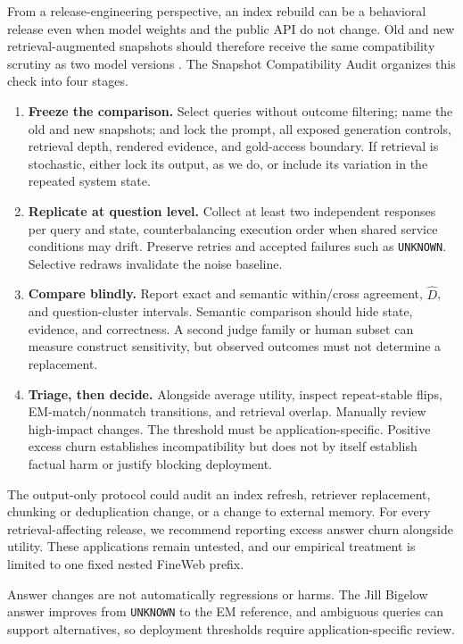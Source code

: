 \documentclass[sigconf,nonacm]{acmart}
\newcommand{\Dhat}{\widehat{D}}
\begin{document}
From a release-engineering perspective, an index rebuild can be a behavioral release even when model weights and the public API do not change. Old and new retrieval-augmented snapshots should therefore receive the same compatibility scrutiny as two model versions \cite{fard2016churn,traeuble2021backward,caciolai2023regression}. The Snapshot Compatibility Audit organizes this check into four stages.
\begin{enumerate}
\item \textbf{Freeze the comparison.} Select queries without outcome filtering; name the old and new snapshots; and lock the prompt, all exposed generation controls, retrieval depth, rendered evidence, and gold-access boundary. If retrieval is stochastic, either lock its output, as we do, or include its variation in the repeated system state.
\item \textbf{Replicate at question level.}  Collect at least two independent responses per query and state, counterbalancing execution order when shared service conditions may drift. Preserve retries and accepted failures such as \texttt{UNKNOWN}. Selective redraws invalidate the noise baseline.
\item \textbf{Compare blindly.}  Report exact and semantic within/cross agreement, $\Dhat$, and question-cluster intervals. Semantic comparison should hide state, evidence, and correctness. A second judge family or human subset can measure construct sensitivity, but observed outcomes must not determine a replacement.
\item \textbf{Triage, then decide.} Alongside average utility, inspect repeat-stable flips, EM-match/nonmatch transitions, and retrieval overlap. Manually review high-impact changes. The threshold must be application-specific. Positive excess churn establishes incompatibility but does not by itself establish factual harm or justify blocking deployment.
\end{enumerate}

The output-only protocol could audit an index refresh, retriever replacement, chunking or deduplication change, or a change to external memory. For every retrieval-affecting release, we recommend reporting excess answer churn alongside utility. These applications remain untested, and our empirical treatment is limited to one fixed nested FineWeb prefix.

Answer changes are not automatically regressions or harms. The Jill Bigelow answer improves from \texttt{UNKNOWN} to the EM reference, and ambiguous queries can support alternatives, so deployment thresholds require application-specific review.
\end{document}
